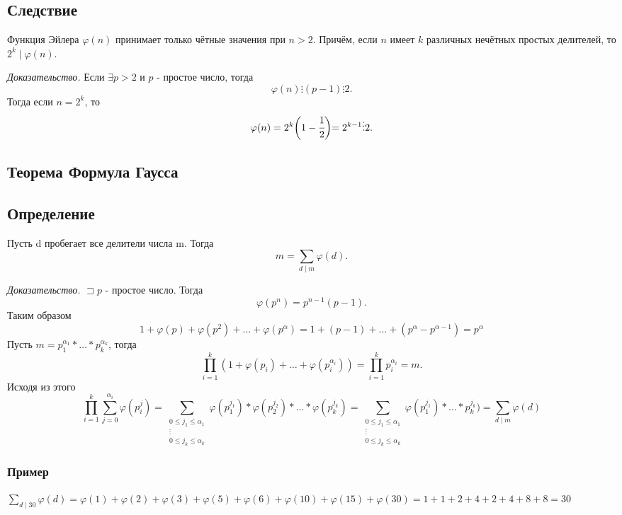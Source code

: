 \documentclass[12pt]{article}
\begin{document}
    \subsection{Следствие} Функция Эйлера $\varphi(n)$ принимает только чётные значения при $n>2$. Причём, если $n$ имеет $k$ различных нечётных простых делителей, то $2^{k}\mid\varphi(n)$.
    \par \textit{Доказательство.} Если $\exists p>2$ и $p$ - простое число, тогда \[\varphi(n)\vdots(p-1)\vdots2.\] Тогда если $n=2^{k}$, то \[\varphi(n)=2^{k}\biggl(1-\cfrac{1}{2}\biggl)=2^{k-1}\vdots2.\]

    \subsection{Теорема Формула Гаусса}
    \subsection{Определение} Пусть d пробегает все делители числа m. Тогда \[m=\sum_{d\mid m}\varphi(d).\]
    \par \textit{Доказательство.} $\sqsupset p$ - простое число. Тогда \[\varphi(p^{n})=p^{n-1}(p-1).\] Таким образом \[1+\varphi(p)+\varphi(p^{2})+\dots+\varphi(p^{\alpha})=1+(p-1)+\dots+(p^{\alpha}-p^{\alpha-1})=p^{\alpha}\] Пусть $m=p^{\alpha_{1}}_{1}*\dots*p^{\alpha_{k}}_{k}$, тогда \[\prod^{k}_{i=1}(1+\varphi(p_{i})+\dots+\varphi(p^{\alpha_{i}}_{i}))=\prod^{k}_{i=1}p^{\alpha_{i}}_{i}=m.\] Исходя из этого \[\prod^{k}_{i=1}\sum^{\alpha_{i}}_{j=0}\varphi(p^{j}_{i})=\sum_{\substack{
                0\leq j_{1}\leq \alpha_{1} \\
                \vdots \\
                0\leq j_{k}\leq \alpha_{k}
            }}\varphi(p^{j_{1}}_{1})*\varphi(p^{j_{2}}_{2})*\dots*\varphi(p^{j_{k}}_{k})=\sum_{\substack{
                0\leq j_{1}\leq \alpha_{1} \\
                \vdots \\
                0\leq j_{k}\leq \alpha_{k}
            }}\varphi(p^{j_{1}}_{1})*\dots*p^{j_{k}}_{k})=\sum_{d\mid m}\varphi(d)\]
    \subsubsection{Пример} $\displaystyle\sum_{d\mid 30}\varphi(d)=\varphi(1)+\varphi(2)+\varphi(3)+\varphi(5)+\varphi(6)+\varphi(10)+\varphi(15)+\varphi(30)=1+1+2+4+2+4+8+8=30$
\end{document}
